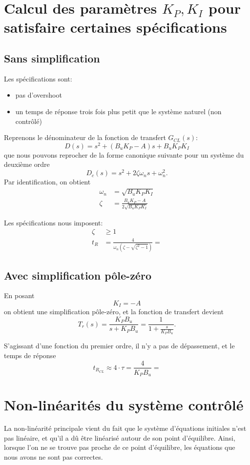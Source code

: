 \documentclass[frenchb, paper=a4, fontsize=11pt]{scrartcl}
\numberwithin{equation}{section}					%
\numberwithin{figure}{section}					%
\numberwithin{table}{section}						%
\begin{document}
\section{Calcul des paramètres $K_P,K_I$ pour satisfaire certaines spécifications}

\subsection{Sans simplification}
Les spécifications sont:
\begin{itemize}
\item pas d'overshoot
\item un temps de réponse trois fois plus petit que le système naturel (non contrôlé)
\end{itemize}

Reprenons le dénominateur de la fonction de transfert $G_{CL}(s)$:
\begin{equation}
D(s) = s^2 +(B_u K_P -A)s + B_u K_P K_I
\end{equation}
que nous pouvons reprocher de la forme canonique suivante pour un système du deuxième ordre
\begin{equation}
D_c(s) = s^2 + 2\zeta \omega_n s + \omega_n^2.
\end{equation}
Par identification, on obtient
\begin{align}
\omega_n &= \sqrt{B_u K_P K_I}\\
\zeta &= \frac{B_u K_P-A}{2\sqrt{B_u K_P K_I}}
\end{align}

Les spécifications nous imposent:
\begin{align}
\zeta &\ge 1\\
t_R & = \frac{4}{\omega_n(\zeta - \sqrt{\zeta^2-1})} = 
\end{align}


\subsection{Avec simplification pôle-zéro}
En posant 
\begin{equation}
K_I = -A
\end{equation}
on obtient une simplification pôle-zéro, et la fonction de transfert devient
\begin{equation}
T_r(s) = \frac{K_P B_u}{s+K_P B_u}= \frac{1}{1+\frac{s}{K_P B_u}}.
\end{equation}

S'agissant d'une fonction du premier ordre, il n'y a pas de dépassement, et le temps de réponse
\begin{equation}
t_{R_{CL}} \approx 4\cdot \tau = \frac{4}{K_P B_u} = 
\end{equation}

\section{Non-linéarités du système contrôlé}
La non-linéarité principale vient du fait que le système d'équations initiales n'est pas linéaire, et qu'il a dû être linéarisé autour de son point d'équilibre. Ainsi, lorsque l'on ne se trouve pas proche de ce point d'équilibre, les équations que nous avons ne sont pas correctes.
\end{document}
